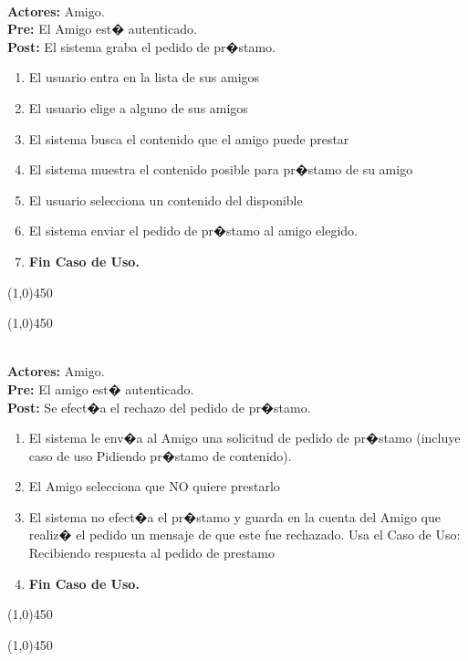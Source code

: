 \documentclass[11pt, a4paper, spanish]{article}
\begin{document}
 \\
\textbf{Actores:} Amigo. \\
\textbf{Pre:} El Amigo est� autenticado. \\
\textbf{Post:} El sistema graba el pedido de pr�stamo.\\
\begin{enumerate}
	\item El usuario entra en la lista de sus amigos
	\item El usuario elige a alguno de sus amigos
	\item El sistema busca el contenido que el amigo puede prestar
	\item El sistema muestra el contenido posible para pr�stamo de su amigo
	\item El usuario selecciona un contenido del disponible
	\item El sistema enviar el pedido de pr�stamo al amigo elegido.
	\item \textbf{Fin Caso de Uso.}
\end{enumerate}
\begin{center} \line(1,0){450} \end{center}
\newpage
\begin{center} \line(1,0){450} \end{center}

 \\
\textbf{Actores:} Amigo. \\
\textbf{Pre:} El amigo est� autenticado. \\
\textbf{Post:} Se efect�a el rechazo del pedido de pr�stamo.\\
\begin{enumerate}
	\item El sistema le env�a al Amigo una solicitud de pedido de pr�stamo (incluye caso de uso Pidiendo pr�stamo de contenido).
	\item El Amigo selecciona que NO quiere prestarlo
	\item El sistema no efect�a el pr�stamo y guarda en la cuenta del Amigo que realiz� el pedido un mensaje de que este fue rechazado. Usa el Caso de Uso: 	Recibiendo respuesta al pedido de prestamo
	\item \textbf{Fin Caso de Uso.}
\end{enumerate}
\begin{center} \line(1,0){450} \end{center}
\newpage
\begin{center} \line(1,0){450} \end{center}
\end{document}
